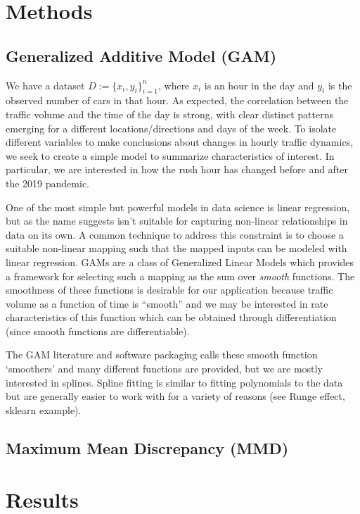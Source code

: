 \documentclass{article}
\begin{document}
\section{Methods}

\subsection{Generalized Additive Model (GAM)}

We have a dataset $D := \{x_i, y_i\}_{i=1}^n$, where $x_i$ is an hour in the day and $y_i$ is the observed number of cars in that hour. As expected, the correlation between the traffic volume and the time of the day is strong, with clear distinct patterns emerging for a different locations/directions and days of the week. To isolate different variables to make conclusions about changes in hourly traffic dynamics, we seek to create a simple model to summarize characteristics of interest. In particular, we are interested in how the rush hour has changed before and after the 2019 pandemic.

One of the most simple but powerful models in data science is linear regression, but as the name suggests isn't suitable for capturing non-linear relationships in data on its own. A common technique to address this constraint is to choose a suitable non-linear mapping such that the mapped inputs can be modeled with linear regression. GAMs are a class of Generalized Linear Models which provides a framework for selecting such a mapping as the sum over \emph{smooth} functions. The smoothness of these functions is desirable for our application because traffic volume as a function of time is ``smooth'' and we may be interested in rate characteristics of this function which can be obtained through differentiation (since smooth functions are differentiable). 

The GAM literature and software packaging calls these smooth function `smoothers' and many different functions are provided, but we are mostly interested in splines. Spline fitting is similar to fitting polynomials to the data but are generally easier to work with for a variety of reasons (see Runge effect, sklearn example). 

\subsection{Maximum Mean Discrepancy (MMD)}

\section{Results}
\end{document}
